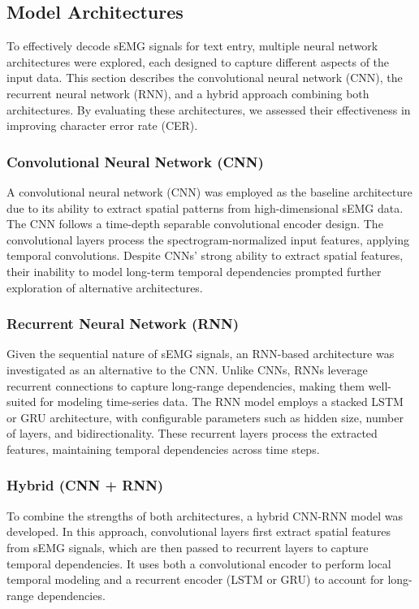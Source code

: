\documentclass{article}
\begin{document}
\subsection{Model Architectures}
To effectively decode sEMG signals for text entry, multiple neural network architectures were explored, each designed to capture different aspects of the input data. This section describes the convolutional neural network (CNN), the recurrent neural network (RNN), and a hybrid approach combining both architectures. By evaluating these architectures, we assessed their effectiveness in improving character error rate (CER).
\subsubsection{Convolutional Neural Network (CNN)}
A convolutional neural network (CNN) was employed as the baseline architecture due to its ability to extract spatial patterns from high-dimensional sEMG data. The CNN follows a time-depth separable convolutional encoder design. The convolutional layers process the spectrogram-normalized input features, applying temporal convolutions. Despite CNNs' strong ability to extract spatial features, their inability to model long-term temporal dependencies prompted further exploration of alternative architectures.
\subsubsection{Recurrent Neural Network (RNN)}
Given the sequential nature of sEMG signals, an RNN-based architecture was investigated as an alternative to the CNN. Unlike CNNs, RNNs leverage recurrent connections to capture long-range dependencies, making them well-suited for modeling time-series data. The RNN model employs a stacked LSTM or GRU architecture, with configurable parameters such as hidden size, number of layers, and bidirectionality. These recurrent layers process the extracted features, maintaining temporal dependencies across time steps. 
\subsubsection{Hybrid (CNN + RNN)}
To combine the strengths of both architectures, a hybrid CNN-RNN model was developed. In this approach, convolutional layers first extract spatial features from sEMG signals, which are then passed to recurrent layers to capture temporal dependencies. It uses both a convolutional encoder to perform local temporal modeling and a recurrent encoder (LSTM or GRU) to account for long-range dependencies. 
\end{document}
